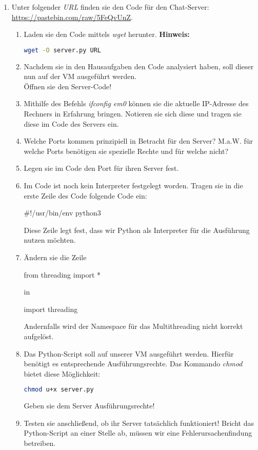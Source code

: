 \documentclass[paper=a4,fontsize=11pt]{scrartcl}%
\numberwithin{equation}{section}
\begin{document}
\begin{enumerate}
	\item Unter folgender \emph{URL} finden sie den Code für den Chat-Server: \url{https://pastebin.com/raw/5FeQvUnZ}.
	\begin{enumerate}
		\item Laden sie den Code mittels \emph{wget} herunter.
		\textbf{Hinweis:}
		\begin{lstlisting}[style=Bash, language=Bash]
wget -O server.py URL
		\end{lstlisting}
		\item Nachdem sie in den Hausaufgaben den Code analysiert haben, soll dieser nun auf der VM ausgeführt werden.\\
		Öffnen sie den Server-Code!
		\item Mithilfe des Befehls \emph{ifconfig em0} können sie die aktuelle IP-Adresse des Rechners in Erfahrung bringen. Notieren sie sich diese und tragen sie diese im Code des Servers ein.
		\item Welche Ports kommen prinzipiell in Betracht für den Server? M.a.W. für welche Ports benötigen sie spezielle Rechte und für welche nicht?
		\item Legen sie im Code den Port für ihren Server fest.
		\item Im Code ist noch kein Interpreter festgelegt worden. Tragen sie in die erste Zeile des Code folgende Code ein:
		\begin{python}
#!/usr/bin/env python3
		\end{python}
		Diese Zeile legt fest, dass wir Python als Interpreter für die Ausführung nutzen möchten.
		\item Ändern sie die Zeile
		\begin{python}
from threading import *
		\end{python}
		in
		\begin{python}
import threading
		\end{python}
		Andernfalls wird der Namespace für das Multithreading nicht korrekt aufgelöst.
		\item Das Python-Script soll auf unserer VM ausgeführt werden. Hierfür benötigt es entsprechende Ausführungsrechte. Das Kommando \emph{chmod} bietet diese Möglichkeit:\\
		\begin{lstlisting}[style=Bash, language=Bash]
chmod u+x server.py
		\end{lstlisting}
		Geben sie dem Server Ausführungsrechte!
		\item Testen sie anschließend, ob ihr Server tatsächlich funktioniert! Bricht das Python-Script an einer Stelle ab, müssen wir eine Fehlerursachenfindung betreiben.

\end{enumerate}
\end{enumerate}
\end{document}
